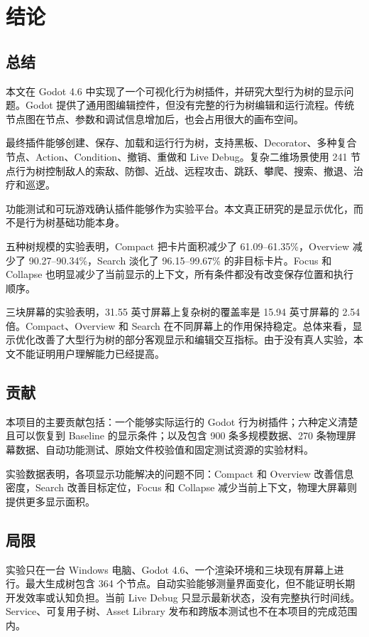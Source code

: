\chapter{结论}
\label{ch:conclusion}

\section{总结}

本文在 Godot 4.6 中实现了一个可视化行为树插件，并研究大型行为树的显示问题。Godot 提供了通用图编辑控件，但没有完整的行为树编辑和运行流程。传统节点图在节点、参数和调试信息增加后，也会占用很大的画布空间。

最终插件能够创建、保存、加载和运行行为树，支持黑板、Decorator、多种复合节点、Action、Condition、撤销、重做和 Live Debug。复杂二维场景使用 241 节点行为树控制敌人的索敌、防御、近战、远程攻击、跳跃、攀爬、搜索、撤退、治疗和巡逻。

功能测试和可玩游戏确认插件能够作为实验平台。本文真正研究的是显示优化，而不是行为树基础功能本身。

五种树规模的实验表明，Compact 把卡片面积减少了 61.09--61.35\%，Overview 减少了 90.27--90.34\%，Search 淡化了 96.15--99.67\% 的非目标卡片。Focus 和 Collapse 也明显减少了当前显示的上下文，所有条件都没有改变保存位置和执行顺序。

三块屏幕的实验表明，31.55 英寸屏幕上复杂树的覆盖率是 15.94 英寸屏幕的 2.54 倍。Compact、Overview 和 Search 在不同屏幕上的作用保持稳定。总体来看，显示优化改善了大型行为树的部分客观显示和编辑交互指标。由于没有真人实验，本文不能证明用户理解能力已经提高。

\section{贡献}

本项目的主要贡献包括：一个能够实际运行的 Godot 行为树插件；六种定义清楚且可以恢复到 Baseline 的显示条件；以及包含 900 条多规模数据、270 条物理屏幕数据、自动功能测试、原始文件校验值和固定测试资源的实验材料。

实验数据表明，各项显示功能解决的问题不同：Compact 和 Overview 改善信息密度，Search 改善目标定位，Focus 和 Collapse 减少当前上下文，物理大屏幕则提供更多显示面积。

\section{局限}

实验只在一台 Windows 电脑、Godot 4.6、一个渲染环境和三块现有屏幕上进行。最大生成树包含 364 个节点。自动实验能够测量界面变化，但不能证明长期开发效率或认知负担。当前 Live Debug 只显示最新状态，没有完整执行时间线。Service、可复用子树、Asset Library 发布和跨版本测试也不在本项目的完成范围内。

